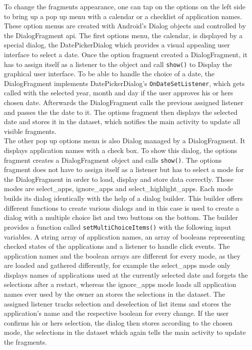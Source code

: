 To  change the fragments appearance, one can tap on the options on the left side to bring up a pop up menu with a calendar or a checklist of application names. These option menus are created with Android's Dialog objects and controlled by the DialogFragment api. The first options menu, the calendar, is displayed by a special dialog, the DatePickerDialog which provides a visual appealing user interface to select a date. Once the option fragment created a DialogFragment, it has to assign itself as a listener to the object and call \lstinline$show()$ to Display the graphical user interface. To be able to handle the choice of a date, the DialogFragment implements DatePickerDialog's \lstinline$OnDateSetListener$, which gets called with the selected year, month and day if the user approves his or hers chosen date. Afterwards the DialogFragment calls the previous assigned listener and passes the the date to it. The options fragment then displays the selected date and stores it in the dataset, which notifies the main activity to update all visible fragments.\\
The other pop up options menu is also Dialog managed by a DialogFragment. It displays application names with a check box. To show this dialog, the options fragment creates a DialogFragment object and calls \lstinline$show()$. The options fragment does not have to assign itself as a listener but has to select a mode for the DialogFragment in order to load, display and store data correctly. Those modes are select\_apps, ignore\_apps and select\_highlight\_apps. Each mode builds its dialog identically with the help of a dialog builder. This builder offers different functions to create various dialogs and in this case is used to create a dialog with a multiple choice list and two buttons on the bottom. The builder provides a function called \lstinline$setMultiChoiceItems()$ with the following input variables. A string array of application names, an array of booleans representing checked states of the applications and a listener to handle click events. The application names and the boolean arrays are different for every mode, as they are loaded and gathered differently, for example the select\_apps mode only displays names of applications used at the currently selected date and forgets the selections after a restart, whereas the ignore\_apps mode loads all application names ever used by the owner an stores the selections in the dataset. The assigned listener tracks selection and deselection of list items and stores the application's name and the respective boolean for every change. If the user confirms his or hers selection, the dialog then stores according to the chosen mode, the selections in the dataset which again tells the main activity to update the fragments.

